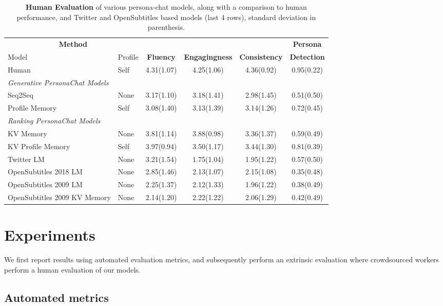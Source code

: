 \documentclass[11pt,a4paper]{article}
\begin{document}
\begin{table*}[t]
  \centering
  \begin{tabular}{ll|cccc}
  \toprule
  \multicolumn{2}{c|}{{\bf Method}} & & & &  \textbf{Persona}   \\
   Model & Profile & \textbf{Fluency} &  \textbf{Engagingness} & \textbf{Consistency} & 
   \textbf{Detection}   \\
  \midrule
  Human  & Self  & 4.31(1.07) & 4.25(1.06)   & 4.36(0.92) &  0.95(0.22) \\
  \midrule
  {\em Generative PersonaChat Models} & \\
  Seq2Seq & None              & 3.17(1.10)&  3.18(1.41) & 2.98(1.45) & 0.51(0.50)\\ Profile Memory   & Self   &3.08(1.40) &  3.13(1.39) & 3.14(1.26) & 0.72(0.45) \\
  \midrule
  {\em Ranking PersonaChat Models} & \\
  KV Memory   & None      & 3.81(1.14) & 3.88(0.98) & 3.36(1.37) & 0.59(0.49)\\ 
  KV Profile Memory   & Self & 3.97(0.94) & 3.50(1.17)  & 3.44(1.30) & 0.81(0.39)\\ 
  \midrule
Twitter LM & None & 3.21(1.54) & 1.75(1.04) & 1.95(1.22) & 0.57(0.50) \\
   OpenSubtitles 2018 LM & None & 2.85(1.46) & 2.13(1.07) & 2.15(1.08) & 0.35(0.48) \\
   OpenSubtitles 2009 LM & None & 2.25(1.37) & 2.12(1.33) & 1.96(1.22) & 0.38(0.49) \\
   OpenSubtitles 2009 KV Memory & None & 2.14(1.20)  & 2.22(1.22) & 2.06(1.29)  & 0.42(0.49) \\ 
  \bottomrule
  \end{tabular}
 \caption{{\bf Human Evaluation} of  various {\sc persona-chat} models,    along with a  comparison to human performance, and Twitter and OpenSubtitles based models (last 4 rows), standard deviation in parenthesis.
\label{tab:human-eval}
     } 
\end{table*}


\section{Experiments}

We first report results using automated evaluation metrics, and subsequently perform an extrinsic evaluation where crowdsourced workers perform a human evaluation of our models. 

\subsection{Automated metrics}
\end{document}
